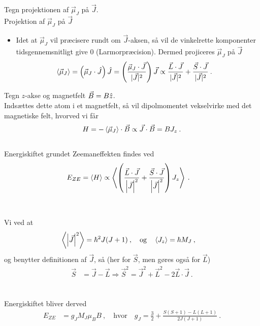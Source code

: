 %
\normalsize{Tegn projektionen af $\Vec{\mu}_J$ på $\Vec{J}$.}\large\\
Projektion af $\Vec{\mu}_J$ på $\Vec{J}$
\begin{itemize}
    \item Idet at $\Vec{\mu}_J$ vil præcisere rundt om $\Vec{J}$-aksen, så vil de vinkelrette komponenter tidsgennemsnitligt give 0 (Larmorpræcision). Dermed projiceres $\Vec{\mu}_J$ på $\Vec{J}$
    \begin{align*}
        \Braket{\Vec{\mu}_J} &= \left(\Vec{\mu}_J \cdot \Hat{J}\right) \Hat{J}
        = \left(\frac{\Vec{\mu}_J \cdot \Vec{J}}{|\Vec{J}|^2}\right) \Vec{J}
        \propto \frac{\Vec{L} \cdot \Vec{J}}{|\Vec{J}|^2} + \frac{\Vec{S} \cdot \Vec{J}}{|\Vec{J}|^2} \: .
    \end{align*}
\end{itemize}
%
\normalsize{Tegn $z$-akse og magnetfelt $\Vec{B} = B\Hat{z}$.}\large\\
Indsættes dette atom i et magnetfelt, så vil dipolmomentet vekselvirke med det magnetiske felt, hvorved vi får
\begin{align*}
    H = - \Braket{\Vec{\mu}_J} \cdot \Vec{B} \propto \Vec{J} \cdot \Vec{B} = BJ_z \: .
\end{align*}\\
Energiskiftet grundet Zeemaneffekten findes ved
\begin{align*}
    E_{ZE} &= \Braket{H} \propto \Braket{\left(\frac{\Vec{L} \cdot \Vec{J}}{\abs{\Vec{J}}^2} + \frac{\Vec{S} \cdot \Vec{J}}{\abs{\Vec{J}}^2}\right)J_z} \: .
\end{align*}\\\\
%
Vi ved at
\begin{align*}
    \Braket{\abs{\Vec{J}}^2} &= \hbar^2 J(J+1) \: , \quad \text{og} \quad \Braket{J_z} = \hbar M_J \: ,
\end{align*}
og benytter definitionen af $\Vec{J}$, så (her for $\Vec{S}$, men gøres også for $\Vec{L}$)
\begin{align*}
    \Vec{S} &= \Vec{J} - \Vec{L} \Rightarrow \Vec{S}^2 = \Vec{J}^2 + \Vec{L}^2 - 2\Vec{L}\cdot\Vec{J} \: .
\end{align*}\\\\
%
Energiskiftet bliver derved
\begin{align*}
    E_{ZE} &= g_J M_J \mu_B B \: , \quad \text{hvor} \quad g_J = \frac{3}{2} + \frac{S(S+1) - L(L+1)}{2J(J+1)} \: .
\end{align*}\\\\

